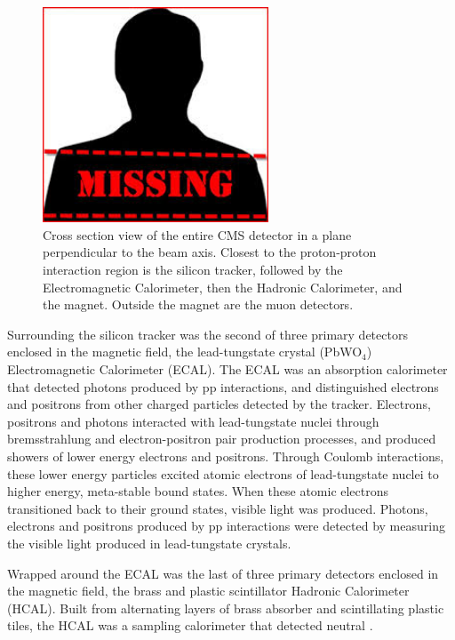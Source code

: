 \begin{figure}[h]
	\centering
	\includegraphics[width=0.6\textwidth]{figures/missingImage.png}
	\caption{Cross section view of the entire CMS detector in a plane perpendicular to the beam axis.  Closest to the
	proton-proton interaction region is the silicon tracker, followed by the Electromagnetic Calorimeter, then the Hadronic 
Calorimeter, and the magnet.  Outside the magnet are the muon detectors.}
	\label{fig:layersOfCMS}
\end{figure}


Surrounding the silicon tracker was the second of three primary detectors enclosed in the magnetic field, the
lead-tungstate crystal (PbWO$_{4}$) Electromagnetic Calorimeter (ECAL).  The ECAL was an absorption calorimeter that
detected photons produced by pp interactions, and distinguished electrons and positrons from other charged 
particles detected by the tracker.  Electrons, positrons and photons interacted with lead-tungstate nuclei 
through bremsstrahlung and electron-positron pair production processes, and produced showers of lower energy
electrons and positrons.  Through Coulomb interactions, these lower energy particles excited atomic electrons
of lead-tungstate nuclei to higher energy, meta-stable bound states.  When these atomic electrons transitioned
back to their ground states, visible light was produced.  Photons, electrons and positrons produced by pp
interactions were detected by measuring the visible light produced in lead-tungstate crystals.

Wrapped around the ECAL was the last of three primary detectors enclosed in the magnetic field, the brass and 
plastic scintillator Hadronic Calorimeter (HCAL).  Built from alternating layers of brass absorber and scintillating
plastic tiles, the HCAL was a sampling calorimeter that detected neutral .

